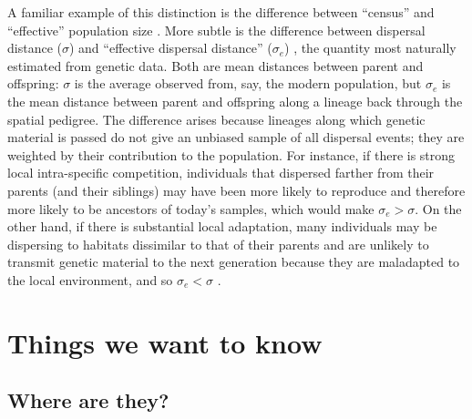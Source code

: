 \documentclass{ar-1col}
\begin{document}
A familiar example of this distinction is the difference between ``census'' and ``effective'' population size
\citep{Charlesworth2009}.
More subtle is the difference between dispersal distance ($\sigma$) and
``effective dispersal distance'' ($\sigma_e$) \citep{Cayuela2018demographic},
the quantity most naturally estimated from genetic data.
Both are mean distances between parent and offspring:
$\sigma$ is the average observed from, say, the modern population,
but $\sigma_e$ is
the mean distance between parent and offspring along a lineage back through the spatial pedigree.
The difference arises because
lineages along which genetic material is passed do not give an unbiased sample of all dispersal events;
they are weighted by their contribution to the population.
For instance, if there is strong local intra-specific competition,
individuals that dispersed farther from their parents (and their siblings)
may have been more likely to reproduce and therefore more likely to be ancestors of today's samples,
which would make $\sigma_e > \sigma$.
On the other hand, if there is substantial local adaptation,
many individuals may be dispersing to habitats dissimilar to that of their parents
and are unlikely to transmit genetic material to the next generation
because they are maladapted to the local environment,
and so $\sigma_e < \sigma$
\citep[for a review, see][]{wangbradburd2014}.


\section{Things we want to know}

\subsection{Where are they?}
\end{document}
